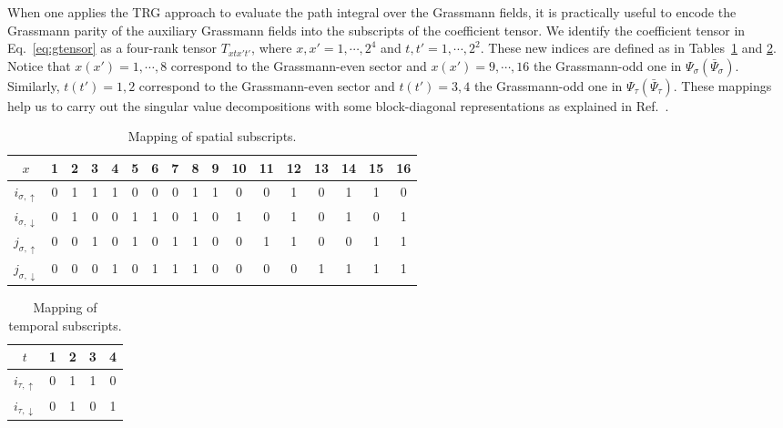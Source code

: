 \documentclass[nofootinbib,prd,aps,superscriptaddress,preprintnumbers,twocolumn,showpacs]{revtex4-1}
\begin{document}
When one applies the TRG approach to evaluate the path integral over the Grassmann fields, it is practically useful to encode the Grassmann parity of the auxiliary Grassmann fields into the subscripts of the coefficient tensor. We identify the coefficient tensor in Eq.~\eqref{eq:gtensor} as a four-rank tensor $T_{xtx't'}$, where $x,x'=1,\cdots,2^4$ and $t,t'=1,\cdots,2^2$. These new indices are defined as in Tables~\ref{tab:index_x} and \ref{tab:index_t}. Notice that $x(x')=1,\cdots,8$ correspond to the Grassmann-even sector and $x(x')=9,\cdots,16$ the Grassmann-odd one in $\Psi_{\sigma}(\bar{\Psi}_{\sigma})$. Similarly, $t(t')=1,2$ correspond to the Grassmann-even sector and $t(t')=3,4$ the Grassmann-odd one in $\Psi_{\tau}(\bar{\Psi}_{\tau})$. These mappings help us to carry out the singular value decompositions with some block-diagonal representations as explained in Ref.~\cite{Akiyama:2020soe}.

\begin{table}[htbp]
	\label{tab:index_x}
	\caption{Mapping of spatial subscripts.}
	\begin{center}
		\begin{tabular}{|c|cccccccc|cccccccc|}\hline
    		$x$ & 1 & 2 & 3 & 4 & 5 & 6 & 7 & 8 & 9 & 10 & 11 & 12 & 13 & 14 & 15 & 16 \\ \hline
    		$i_{\sigma,\uparrow}$      & 0 & 1 & 1 & 1 & 0 & 0 & 0 & 1 & 1 & 0 & 0 & 1 & 0 & 1 & 1 & 0\\
    		$i_{\sigma,\downarrow}$ & 0 & 1 & 0 & 0 & 1 & 1 & 0 & 1 & 0 & 1 & 0 & 1 & 0 & 1 & 0 & 1\\
    		$j_{\sigma,\uparrow}$      & 0 & 0 & 1 & 0 & 1 & 0 & 1 & 1 & 0 & 0 & 1 & 1 & 0 & 0 & 1 & 1\\
    		$j_{\sigma,\downarrow}$ & 0 & 0 & 0 & 1 & 0 & 1 & 1 & 1 & 0 & 0 & 0 & 0 & 1 & 1 & 1 & 1\\ \hline
	\end{tabular}
	\end{center}
\end{table}

\begin{table}[htbp]
	\label{tab:index_t}
	\caption{Mapping of temporal subscripts.}
	\begin{center}
		\begin{tabular}{|c|cc|cc|}\hline
    		$t$ & 1 & 2 & 3 & 4 \\ \hline
    		$i_{\tau,\uparrow}$      & 0 & 1 & 1 & 0  \\
    		$i_{\tau,\downarrow}$ & 0 & 1  & 0 & 1\\ \hline
	\end{tabular}
	\end{center}
\end{table}
\end{document}
